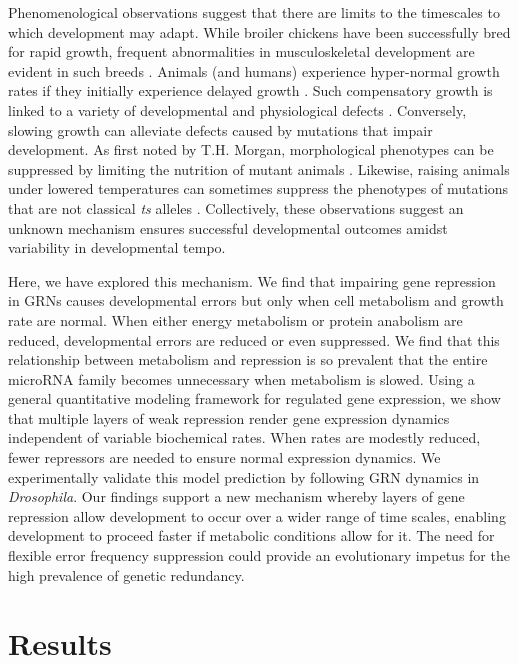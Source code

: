Phenomenological observations suggest that there are limits to the timescales to which development may adapt. While broiler chickens have been successfully bred for rapid growth, frequent abnormalities in musculoskeletal development are evident in such breeds \cite{Julian2005,Whitehead2003}. Animals (and humans) experience hyper-normal growth rates if they initially experience delayed growth \cite{Arendt1997}. Such compensatory growth is linked to a variety of developmental and physiological defects \cite{Metcalfe2001}. Conversely, slowing growth can alleviate defects caused by mutations that impair development. As first noted by T.H. Morgan, morphological phenotypes can be suppressed by limiting the nutrition of mutant animals \cite{Child1939,Morgan1915,Morgan1929,Sang1963}. Likewise, raising animals under lowered temperatures can sometimes suppress the phenotypes of mutations that are not classical \textit{ts} alleles \cite{Child1935,Krafka1920,Lewis1980,Villee1943}. Collectively, these observations suggest an unknown mechanism ensures successful developmental outcomes amidst variability in developmental tempo.

Here, we have explored this mechanism. We find that impairing gene repression in GRNs causes developmental errors but only when cell metabolism and growth rate are normal. When either energy metabolism or protein anabolism are reduced, developmental errors are reduced or even suppressed. We find that this relationship between metabolism and repression is so prevalent that the entire microRNA family becomes unnecessary when metabolism is slowed. Using a general quantitative modeling framework for regulated gene expression, we show that multiple layers of weak repression render gene expression dynamics independent of variable biochemical rates. When rates are modestly reduced, fewer repressors are needed to ensure normal expression dynamics. We experimentally validate this model prediction by following GRN dynamics in \textit{Drosophila}. Our findings support a new mechanism whereby layers of gene repression allow development to occur over a wider range of time scales, enabling development to proceed faster if metabolic conditions allow for it. The need for flexible error frequency suppression could provide an evolutionary impetus for the high prevalence of genetic redundancy.

\section{Results}

